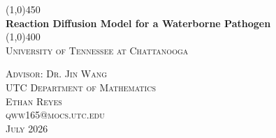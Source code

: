 \documentclass[12pt]{article}
\begin{document}
\begin{titlepage}
    \begin{center}
    \vspace*{1cm}
    \line(1,0){450} \\
    [.25in]
    \huge{\bfseries Reaction Diffusion Model for a Waterborne Pathogen} \\
    [2mm]
    \line(1,0){400} \\
    [1.5cm]
    \textsc{\LARGE University of Tennessee at Chattanooga}\\
    [.5cm]
    
    \vfill %
    
    \textsc{\Large Advisor: Dr. Jin Wang} \\
    \textsc{\small UTC Department of Mathematics} \\
    [1cm]
    \textsc{\Large Ethan Reyes} \\
    \textsc{\small qww165@mocs.utc.edu} \\
    [1cm]
    \textsc{\Large July 2026}
    \vspace*{1cm}
    \end{center}
\end{titlepage}

\begin{abstract}
    TBD
    \\
    \\ \textbf{Keywords:} \emph{Reaction-Diffusion, Waterborne Pathogen, Numerical Simulation, Cholera}
\end{abstract}

\newpage

\tableofcontents
\newpage
{}




\newpage %


\newpage %

\printbibliography
\end{document}
